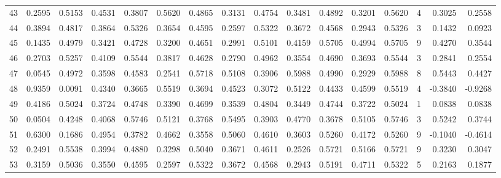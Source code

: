 \begin{tabular}{lrrrrrrrrrrrrrrr}
43  &      0.2595 &  0.5153 &  0.4531 &  0.3807 &  0.5620 &  0.4865 &  0.3131 &  0.4754 &  0.3481 &  0.4892 &   0.3201 &     0.5620 &      4 &                    0.3025 &                     0.2558 \\
44  &      0.3894 &  0.4817 &  0.3864 &  0.5326 &  0.3654 &  0.4595 &  0.2597 &  0.5322 &  0.3672 &  0.4568 &   0.2943 &     0.5326 &      3 &                    0.1432 &                     0.0923 \\
45  &      0.1435 &  0.4979 &  0.3421 &  0.4728 &  0.3200 &  0.4651 &  0.2991 &  0.5101 &  0.4159 &  0.5705 &   0.4994 &     0.5705 &      9 &                    0.4270 &                     0.3544 \\
46  &      0.2703 &  0.5257 &  0.4109 &  0.5544 &  0.3817 &  0.4628 &  0.2790 &  0.4962 &  0.3554 &  0.4690 &   0.3693 &     0.5544 &      3 &                    0.2841 &                     0.2554 \\
47  &      0.0545 &  0.4972 &  0.3598 &  0.4583 &  0.2541 &  0.5718 &  0.5108 &  0.3906 &  0.5988 &  0.4990 &   0.2929 &     0.5988 &      8 &                    0.5443 &                     0.4427 \\
48  &      0.9359 &  0.0091 &  0.4340 &  0.3665 &  0.5519 &  0.3694 &  0.4523 &  0.3072 &  0.5122 &  0.4433 &   0.4599 &     0.5519 &      4 &                   -0.3840 &                    -0.9268 \\
49  &      0.4186 &  0.5024 &  0.3724 &  0.4748 &  0.3390 &  0.4699 &  0.3539 &  0.4804 &  0.3449 &  0.4744 &   0.3722 &     0.5024 &      1 &                    0.0838 &                     0.0838 \\
50  &      0.0504 &  0.4248 &  0.4068 &  0.5746 &  0.5121 &  0.3768 &  0.5495 &  0.3903 &  0.4770 &  0.3678 &   0.5105 &     0.5746 &      3 &                    0.5242 &                     0.3744 \\
51  &      0.6300 &  0.1686 &  0.4954 &  0.3782 &  0.4662 &  0.3558 &  0.5060 &  0.4610 &  0.3603 &  0.5260 &   0.4172 &     0.5260 &      9 &                   -0.1040 &                    -0.4614 \\
52  &      0.2491 &  0.5538 &  0.3994 &  0.4880 &  0.3298 &  0.5040 &  0.3671 &  0.4611 &  0.2526 &  0.5721 &   0.5166 &     0.5721 &      9 &                    0.3230 &                     0.3047 \\
53  &      0.3159 &  0.5036 &  0.3550 &  0.4595 &  0.2597 &  0.5322 &  0.3672 &  0.4568 &  0.2943 &  0.5191 &   0.4711 &     0.5322 &      5 &                    0.2163 &                     0.1877 \\

\end{tabular}

